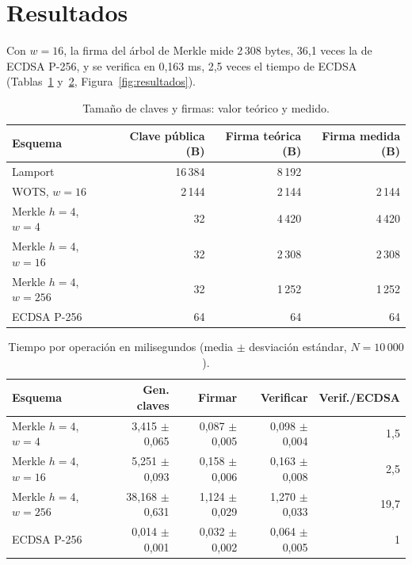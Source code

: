 \documentclass[12pt,letterpaper]{article}
\newif\ifborrador
\newcommand{\pend}[1]{\ifborrador\textcolor{red}{\textbf{[#1]}}\fi}
\begin{document}
\section{Resultados}
Con $w=16$, la firma del árbol de Merkle mide 2\,308 bytes, 36,1 veces la de ECDSA P-256, y se verifica en 0,163 ms, 2,5 veces el tiempo de ECDSA (Tablas~\ref{tab:tamanos} y~\ref{tab:tiempos}, Figura~\ref{fig:resultados}).

\begin{table}[htbp]
  \centering
  \caption{Tamaño de claves y firmas: valor teórico y medido.}
  \label{tab:tamanos}
  \begin{tabular}{lrrr}
    \toprule
    Esquema & Clave pública (B) & Firma teórica (B) & Firma medida (B) \\
    \midrule
    Lamport                  & 16\,384 & 8\,192 & \pend{--} \\
    WOTS, $w=16$             & 2\,144  & 2\,144 & 2\,144 \\
    Merkle $h=4$, $w=4$      & 32      & 4\,420 & 4\,420 \\
    Merkle $h=4$, $w=16$     & 32      & 2\,308 & 2\,308 \\
    Merkle $h=4$, $w=256$    & 32      & 1\,252 & 1\,252 \\
    ECDSA P-256              & 64      & 64     & 64 \\
    \bottomrule
  \end{tabular}
\end{table}

\begin{table}[htbp]
  \centering
  \caption{Tiempo por operación en milisegundos (media $\pm$ desviación estándar, $N=10\,000$).}
  \label{tab:tiempos}
  \small
  \begin{tabular}{lrrrr}
    \toprule
    Esquema & Gen. claves & Firmar & Verificar & Verif./ECDSA \\
    \midrule
    Merkle $h=4$, $w=4$   & 3,415 $\pm$ 0,065 & 0,087 $\pm$ 0,005 & 0,098 $\pm$ 0,004 & 1,5 \\
    Merkle $h=4$, $w=16$  & 5,251 $\pm$ 0,093 & 0,158 $\pm$ 0,006 & 0,163 $\pm$ 0,008 & 2,5 \\
    Merkle $h=4$, $w=256$ & 38,168 $\pm$ 0,631 & 1,124 $\pm$ 0,029 & 1,270 $\pm$ 0,033 & 19,7 \\
    ECDSA P-256           & 0,014 $\pm$ 0,001 & 0,032 $\pm$ 0,002 & 0,064 $\pm$ 0,005 & 1 \\
    \bottomrule
  \end{tabular}
\end{table}
\end{document}
